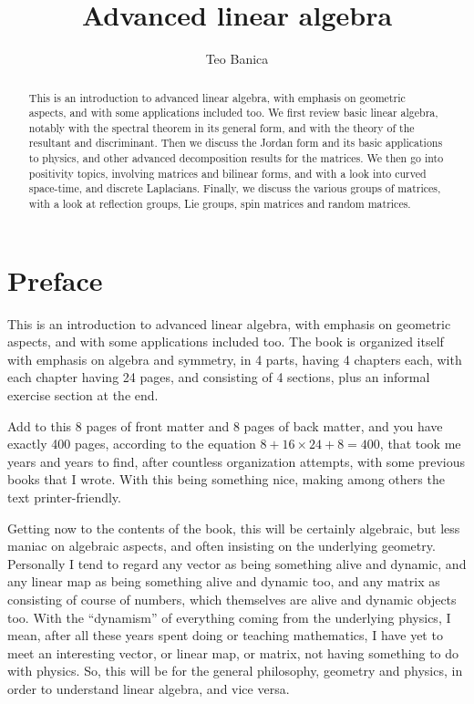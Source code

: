 \documentclass[12pt]{amsbook}
\begin{document}
\title{Advanced linear algebra}

\author{Teo Banica}
\address{Department of Mathematics, University of Cergy-Pontoise, F-95000 Cergy-Pontoise, France. {\tt teo.banica@gmail.com}}


\begin{abstract}
This is an introduction to advanced linear algebra, with emphasis on geometric aspects, and with some applications included too. We first review basic linear algebra, notably with the spectral theorem in its general form, and with the theory of the resultant and discriminant. Then we discuss the Jordan form and its basic applications to physics, and other advanced decomposition results for the matrices. We then go into positivity topics, involving matrices and bilinear forms, and with a look into curved space-time, and discrete Laplacians. Finally, we discuss the various groups of matrices, with a look at reflection groups, Lie groups, spin matrices and random matrices.
\end{abstract}

\maketitle

\chapter*{Preface}

This is an introduction to advanced linear algebra, with emphasis on geometric aspects, and with some applications included too. The book is organized itself with emphasis on algebra and symmetry, in 4 parts, having 4 chapters each, with each chapter having 24 pages, and consisting of 4 sections, plus an informal exercise section at the end. 

\bigskip

Add to this 8 pages of front matter and 8 pages of back matter, and you have exactly 400 pages, according to the equation $8+16\times 24+8=400$, that took me years and years to find, after countless organization attempts, with some previous books that I wrote. With this being something nice, making among others the text printer-friendly.

\bigskip

Getting now to the contents of the book, this will be certainly algebraic, but less maniac on algebraic aspects, and often insisting on the underlying geometry. Personally I tend to regard any vector as being something alive and dynamic, and any linear map as being something alive and dynamic too, and any matrix as consisting of course of numbers, which themselves are alive and dynamic objects too. With the ``dynamism'' of everything coming from the underlying physics, I mean, after all these years spent doing or teaching mathematics, I have yet to meet an interesting vector, or linear map, or matrix, not having something to do with physics. So, this will be for the general philosophy, geometry and physics, in order to understand linear algebra, and vice versa.
\end{document}
